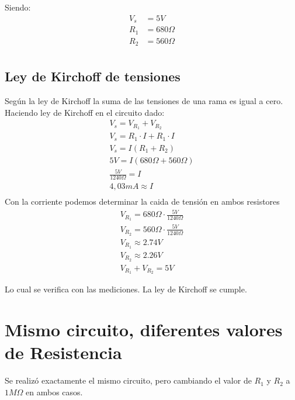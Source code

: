 \documentclass[12pt]{article}
\begin{document}
Siendo:
\begin{align}
    V_s &= 5V\\
    R_1 &= 680 \Omega\\
    R_2 &= 560 \Omega\\
\end{align}
\subsection{Ley de Kirchoff de tensiones}
Según la ley de Kirchoff la suma de las tensiones de una rama es igual a cero.
Haciendo ley de Kirchoff en el circuito dado:
\begin{align}
    V_s = V_{R_1} + V_{R_2}\\
    V_s = R_1 \cdot I + R_1 \cdot I\\
    V_s = I(R_1+R_2)\\
    5V = I( 680 \Omega + 560 \Omega)\\
    \frac{5V}{1240 \Omega} = I \\
    4,03mA \approx I\\
\end{align}
Con la corriente podemos determinar la caida de tensión en ambos resistores
\begin{align}
    V_{R_1} = 680 \Omega \cdot \frac{5V}{1240 \Omega}\\
    V_{R_2} = 560 \Omega \cdot \frac{5V}{1240 \Omega}\\
    V_{R_1} \approx 2.74V\\
    V_{R_2} \approx 2.26V\\
    V_{R_1} + V_{R_2} = 5V 
\end{align}

Lo cual se verifica con las mediciones. La ley de Kirchoff se cumple.
\section{Mismo circuito, diferentes valores de Resistencia}
Se realizó exactamente el mismo circuito, pero cambiando el valor de $R_1$ y $R_2$ a $1M\Omega$ en ambos casos.
\end{document}
